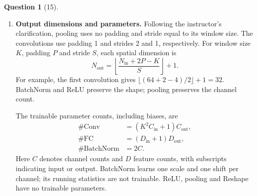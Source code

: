 \documentclass[12pt]{article}
\theoremstyle{definition}
\newtheorem{exercise}{Question}%
\begin{document}
\begin{exercise}[15]
{\begin{enumerate}
Let $A_{m,c,i,j}$ and $B_{o,m,a,b}$ be the first and last convolution
weights, with $c,m,o$ indexing input, intermediate and output channels.
Use zero-based indices $i,j\in\{0,1,2\}$ for the first kernel,
$a,b\in\{0,1\}$ for the last kernel, and $u,v\in\{0,1\}$ for pooling.
For output $(p,q)$, contributing input coordinates are
\[
(r,s)=(12p+6a+3u+i,\;12q+6b+3v+j).
\]
The total stride is $3\cdot2\cdot2=12$, and the offsets cover $0$ through
$11$. Each offset has a unique representation, so averaging four values gives
\[
\boxed{K_{o,c,6a+3u+i,\,6b+3v+j}
=\frac14\sum_m B_{o,m,a,b}A_{m,c,i,j}}.
\]
For first and last convolution biases $b_m^{(1)}$ and $b_o^{(2)}$,
averaging preserves the constant first bias, giving
\[
b_o^{\mathrm{eff}}=b_o^{(2)}
+\sum_m b_m^{(1)}\sum_{a,b=0}^1 B_{o,m,a,b}.
\]
Absent biases are treated as zero.

\item \textbf{Output dimensions and parameters.}
Following the instructor's clarification, pooling uses no padding and
stride equal to its window size. The convolutions use padding 1 and
strides 2 and 1, respectively.
For window size $K$, padding $P$ and stride $S$, each spatial dimension is
\[
N_{\mathrm{out}}=\left\lfloor\frac{N_{\mathrm{in}}+2P-K}{S}\right\rfloor+1.
\]
For example, the first convolution gives
$\lfloor(64+2-4)/2\rfloor+1=32$.
BatchNorm and ReLU preserve the shape; pooling preserves the channel count.

The trainable parameter counts, including biases, are
\[
\begin{aligned}
\#\mathrm{Conv}&=(K^2C_{\mathrm{in}}+1)C_{\mathrm{out}},\\
\#\mathrm{FC}&=(D_{\mathrm{in}}+1)D_{\mathrm{out}},\\
\#\mathrm{BatchNorm}&=2C.
\end{aligned}
\]
Here $C$ denotes channel counts and $D$ feature counts, with subscripts
indicating input or output. BatchNorm learns one scale and one shift per
channel; its running statistics are not trainable. ReLU, pooling and
Reshape have no trainable parameters.


\end{enumerate}}
\end{exercise}
\end{document}
